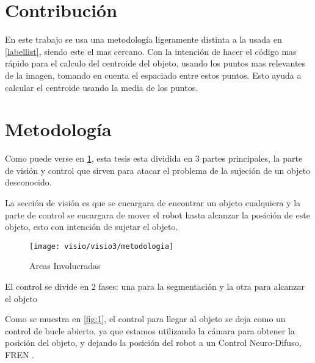 \section{Contribución}
En este trabajo se usa una metodología ligeramente distinta a la usada en \cref{labellist},  siendo este el mas cercano.
Con la intención de hacer el código mas rápido para el calculo del centroide del objeto, usando los puntos mas relevantes de la imagen, tomando en cuenta el espaciado entre estos puntos.
Esto ayuda a calcular el centroide usando la media de los puntos.

\section{Metodología}

Como puede verse en \cref{fig:metodologia}, esta tesis esta dividida en 3 partes principales, la parte de visión y control que sirven para atacar el problema de la sujeción de un objeto desconocido.

La sección de visión es que se encargara de encontrar un objeto cualquiera y la parte de control se encargara de mover el robot hasta alcanzar la posición de este objeto, esto con intención de sujetar el objeto.

\begin{figure}[h]
	\centering
	\texttt{[image: visio/visio3/metodologia]}
	\caption{Areas Involucradas}
	\label{fig:metodologia}
\end{figure}

El control se divide en 2 fases: una para la segmentación y la otra para alcanzar el objeto

Como se muestra en \cref{fig:1}, el control para llegar al objeto se deja como un control de bucle abierto, ya que estamos utilizando la cámara para obtener la posición del objeto, y dejando la posición del robot a un Control Neuro-Difuso, FREN \cite{fren}.

